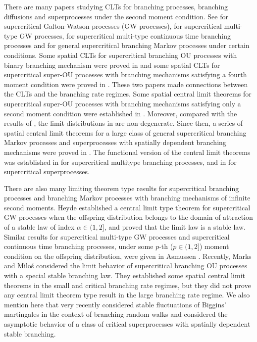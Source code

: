 \documentclass[12pt,a4paper]{amsart}
\theoremstyle{plain}
\theoremstyle{definition}
\numberwithin{equation}{section}
\begin{document}
There are many papers studying CLTs for branching processes, branching diffusions and superprocesses under the second moment condition.
See \cite{Heyde1970A-rate, HeydeBrown1871An-invariance, HeydeLeslie1971Improved} for supercritical Galton-Watson processes (GW processes), \cite{KestenStigum1966Additional,KestenStigum1966A-limit} for supercritical multi-type GW processes, \cite{Athreya1969Limit,Athreya1969LimitB,Athreya1971Some} for supercritical multi-type continuous time branching processes and \cite{AsmussenHering1983Branching} for general supercritical branching Markov processes under certain conditions.
Some spatial CLTs for   supercritical branching OU processes with binary branching mechanism were proved in \cite{AdamczakMilos2015CLT} and some spatial CLTs for supercritical super-OU processes with branching mechanisms satisfying a fourth moment condition were proved in \cite{Milos2012Spatial}.
These two papers made connections between the CLTs and  the branching rate regimes.
Some spatial central limit theorems for supercritical super-OU  processes with branching mechanisms satisfying only a second moment condition were established in \cite{RenSongZhang2014Central}.
Moreover, compared with the results of \cite{AdamczakMilos2015CLT,Milos2012Spatial}, the limit distributions in \cite{RenSongZhang2014Central} are non-degenerate.
Since then, a series of spatial central limit theorems for a large class of general supercritical branching Markov processes and superprocesses with spatially dependent branching mechanisms were proved in \cite{RenSongZhang2014CentralB,RenSongZhang2015Central,RenSongZhang2017Central}.
The functional version of the central limit theorems was established in \cite{Janson2004Functional} for supercritical multitype branching processes, and  in \cite{RenSongZhang2017Functional} for supercritical superprocesses.

There are also many limiting theorem type results for supercritical branching processes and branching Markov processes with branching mechanisms of infinite second moments.
Heyde \cite{Heyde1971Some} established a central limit type  theorem for supercritical GW processes when the offspring distribution belongs to the domain of attraction of a stable law of index $\alpha\in (1, 2]$, and proved that the limit law is  a stable law.
Similar results  for supercritical multi-type GW processes and supercritical  continuous time branching processes,
under some $p$-th ($p\in(1,2]$) moment condition on the offspring distribution, were given in Asmussen \cite{Asmussen76Convergence}.
Recently, Marks and Milo\'s \cite{MarksMilos2018CLT} considered the limit behavior of supercritical branching OU processes with a special stable branching law.
They established some spatial central limit theorems in the small and critical branching rate regimes, but they did not prove any central limit theorem type result in the large branching rate regime.
We also mention here that very recently \cite{IksanovKoleskoMeiners2018Stable-like} considered stable fluctuations of Biggins' martingales in the context of branching random walks and \cite{RenSongSun2018Limit} considered the asymptotic behavior of a class of critical superprocesses with spatially dependent stable branching.
\end{document}

